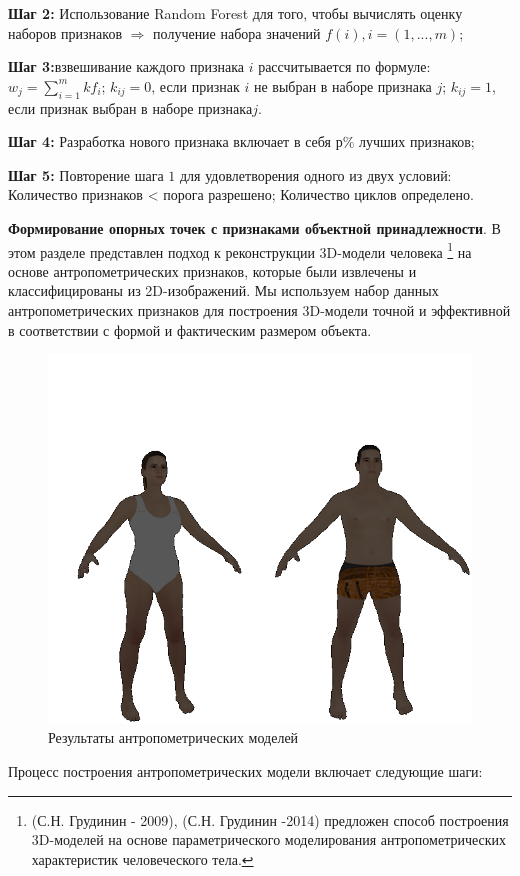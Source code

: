 \textbf{Шаг 2:} Использование Random Forest для того, чтобы вычислять оценку наборов признаков $\Rightarrow$ получение набора значений $f\left(i\right), i= \left(1,..., m\right)$;

\textbf{Шаг 3:}взвешивание каждого признака $i$ рассчитывается по формуле: $w_j= \sum^m_{i=1}kf_i$; $k_{ij} = 0$, если признак $i$ не выбран в наборе признака $j$; $k_{ij}= 1$, если признак выбран в наборе признака$j$.

\textbf{Шаг 4:} Разработка нового признака включает в себя $р\%$ лучших признаков;

\textbf{Шаг 5:} Повторение шага $1$ для удовлетворения одного из двух условий:  Количество признаков < порога разрешено; Количество циклов определено.

\textbf{Формирование опорных точек с признаками объектной принадлежности}. В этом разделе представлен подход к реконструкции 3D-модели человека \footnote{(С.Н. Грудинин - 2009), (С.Н. Грудинин -2014) предложен способ построения 3D-моделей на основе параметрического моделирования антропометрических характеристик человеческого тела.} на основе антропометрических признаков, которые были извлечены и классифицированы из 2D-изображений.
Мы используем набор данных  антропометрических признаков для построения 3D-модели точной и эффективной в соответствии с формой и фактическим размером объекта.
\begin{figure}
\centering
\includegraphics [scale=0.4] {images/h22.png}
\begin{center}
\caption{Результаты антропометрических моделей} \label{img17}
\end{center}
\end{figure}
Процесс построения антропометрических модели включает следующие шаги:

